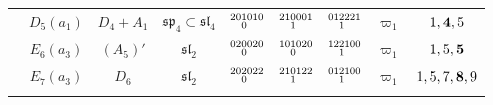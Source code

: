 \documentclass{amsart}
\theoremstyle{definition}
\newcommand{\0}{\mathcal{O}}
\begin{document}
\begin{table}[htp]
\begin{center}
\begin{tabular}{|c | c| c| c| c| c| c|c | c|}
				& $D_5(a_1)$ & $D_4+A_1$ & $\mathfrak{sp}_4\subset \mathfrak{sl}_4$ & $\scriptsize{\begin{aligned}20 &1010 \\[-1.8mm] &0\end{aligned}}$ & $\scriptsize{\begin{aligned}21 &0001 \\[-1.8mm] &1\end{aligned}}$ 
                & $\scriptsize{\begin{aligned} 0 1 &2221 \\[-1.8mm] &1\end{aligned}}$ &  $\varpi_1$ 
                & $1,{\bf 4},5$ \\  

                & $E_6(a_3)$ & $(A_5)'$ & $\mathfrak{sl}_2$ & $\scriptsize{\begin{aligned}02 &0020 \\[-1.8mm] &0\end{aligned}}$ & $\scriptsize{\begin{aligned}10 &1020 \\[-1.8mm] &0\end{aligned}}$  
                & $\scriptsize{\begin{aligned}1 2 &2100 \\[-1.8mm] &1\end{aligned}}$ &  $\varpi_1$ 
                & $1,5,\bf{5}$   \\  


                & $E_7(a_3)$ & $D_6$ & $\mathfrak{sl}_2$ & $\scriptsize{\begin{aligned}20 &2022 \\[-1.8mm] &0\end{aligned}}$ & $\scriptsize{\begin{aligned}21 &0122 \\[-1.8mm] &1\end{aligned}}$ 
                & $\scriptsize{\begin{aligned}0 1 &2100 \\[-1.8mm] &1\end{aligned}}$ &  $\varpi_1$ 
                & $1,5,7,{\bf 8},9$ \\ 
				
				\hline & & & & & & & &  \\[-0.3cm]
				

\end{tabular}
\end{center}
\end{table}
\end{document}
